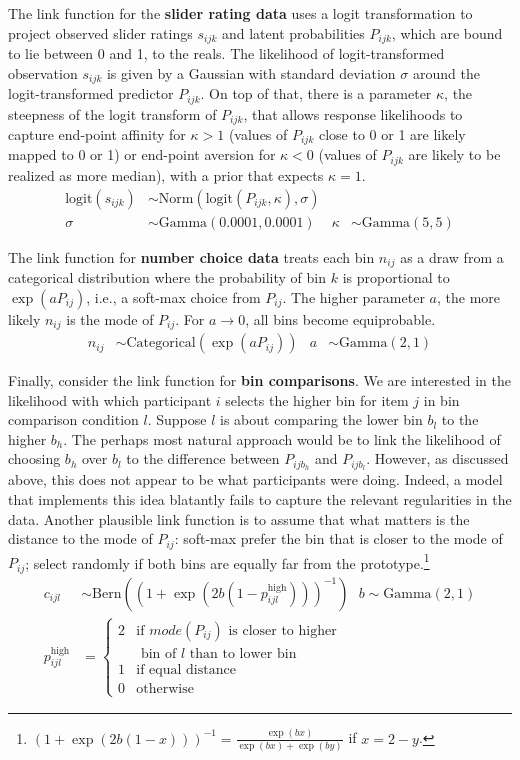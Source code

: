 \documentclass[10pt,letterpaper]{article}
\DeclareMathOperator{\expo}{exp}
\begin{document}
The link function for the \textbf{slider rating data} uses a logit transformation to project observed
slider ratings $s_{ijk}$ and latent probabilities $P_{ijk}$, which are bound to lie between 0
and 1, to the reals. The likelihood of logit-transformed observation $s_{ijk}$ is given by a
Gaussian with standard deviation $\sigma$ around the logit-transformed predictor $P_{ijk}$. On
top of that, there is a parameter $\kappa$, the steepness of the logit transform of $P_{ijk}$,
that allows response likelihoods to capture end-point affinity for $\kappa >1$ (values of
$P_{ijk}$ close to 0 or 1 are likely mapped to 0 or 1) or end-point aversion for $\kappa <0$
(values of $P_{ijk}$ are likely to be realized as more median), with a prior that expects
$\kappa=1$.
\begin{align*}
  \text{logit}(s_{ijk}) &\sim
        \text{Norm}(\text{logit}(P_{ijk}, \kappa), \sigma) \\
        \sigma &  \sim \text{Gamma}(0.0001,0.0001) & \kappa &\sim \text{Gamma}(5,5)
\end{align*}
 
The link function for \textbf{number choice data} treats each bin $n_{ij}$ as a draw from a categorical
distribution where the probability of bin $k$ is proportional to $\expo(a P_{ij})$, i.e., a
soft-max choice from $P_{ij}$. The higher parameter $a$, the more likely $n_{ij}$ is the mode
of $P_{ij}$. For $a \rightarrow 0$, all bins become equiprobable.
\begin{align*}
  n_{ij} & \sim
        \text{Categorical}(\expo(a P_{ij})) &
 a & \sim \text{Gamma}(2,1)
\end{align*}

Finally, consider the link function for \textbf{bin comparisons}. We are interested in the
likelihood with which participant $i$ selects the higher bin for item $j$ in bin comparison
condition $l$. Suppose $l$ is about comparing the lower bin $b_l$ to the higher $b_h$. The
perhaps most natural approach would be to link the likelihood of choosing $b_h$ over $b_l$ to
the difference between $P_{ijb_h}$ and $P_{ijb_l}$. However, as discussed above, this does not
appear to be what participants were doing. Indeed, a model that implements this idea blatantly
fails to capture the relevant regularities in the data. Another plausible link function is to
assume that what matters is the distance to the mode of $P_{ij}$: soft-max prefer the bin that
is closer to the mode of $P_{ij}$; select randomly if both bins are equally far from the
prototype.\footnote{$(1 + \exp(2b(1-x)) )^{-1} = \frac{\exp(b x)}{\exp(b
    x) + \exp(b y)}$
  if $x = 2 - y$.}
\begin{align*}
  c_{ijl} & \sim \text{Bern}( (1 + \exp(2b(1-p^{\text{high}}_{ijl})) )^{-1} ) \ \ \ 
  b  \sim \text{Gamma}(2,1) \\
  p^\text{high}_{ijl} & = \begin{cases}
    2 & \text{if $mode(P_{ij})$ is closer to higher} \\
    & \text{ bin of $l$ than to lower bin } \\ 1 & \text{if equal
      distance} \\ 0 & \text{otherwise}  
  \end{cases}
\end{align*}
\end{document}
